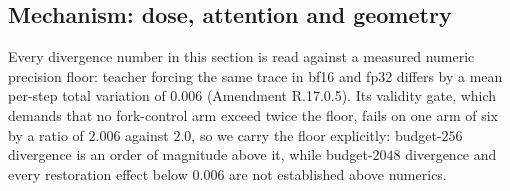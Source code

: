 \documentclass{article}
\begin{document}
\iffalse
\subsection{Mechanism: dose, attention and geometry}
\label{sec:mechanism-r17}
Every divergence number in this section is read against a measured numeric
precision floor: teacher forcing the same trace in bf16 and fp32 differs by a
mean per-step total variation of $0.006$ (Amendment R.17.0.5). Its validity
gate, which demands that no fork-control arm exceed twice the floor, fails on
one arm of six by a ratio of $2.006$ against $2.0$, so we carry the floor
explicitly: budget-$256$ divergence is an order of magnitude above it, while
budget-$2048$ divergence and every restoration effect below $0.006$ are not
established above numerics.
\end{document}
